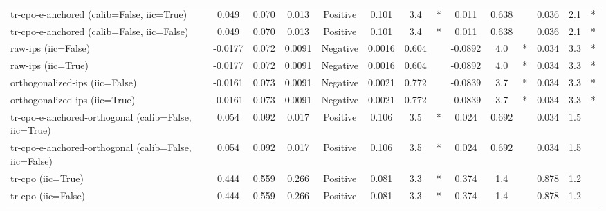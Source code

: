 \begin{table}[htbp]
\begin{tabular}{l|ccccccccccccc}
tr-cpo-e-anchored (calib=False, iic=True) & 0.049 & 0.070 & 0.013 & Positive & 0.101 & 3.4 & * & 0.011 & 0.638 &  & 0.036 & 2.1 & * \\
tr-cpo-e-anchored (calib=False, iic=False) & 0.049 & 0.070 & 0.013 & Positive & 0.101 & 3.4 & * & 0.011 & 0.638 &  & 0.036 & 2.1 & * \\
raw-ips (iic=False) & -0.0177 & 0.072 & 0.0091 & Negative & 0.0016 & 0.604 &  & -0.0892 & 4.0 & * & 0.034 & 3.3 & * \\
raw-ips (iic=True) & -0.0177 & 0.072 & 0.0091 & Negative & 0.0016 & 0.604 &  & -0.0892 & 4.0 & * & 0.034 & 3.3 & * \\
orthogonalized-ips (iic=False) & -0.0161 & 0.073 & 0.0091 & Negative & 0.0021 & 0.772 &  & -0.0839 & 3.7 & * & 0.034 & 3.3 & * \\
orthogonalized-ips (iic=True) & -0.0161 & 0.073 & 0.0091 & Negative & 0.0021 & 0.772 &  & -0.0839 & 3.7 & * & 0.034 & 3.3 & * \\
tr-cpo-e-anchored-orthogonal (calib=False, iic=True) & 0.054 & 0.092 & 0.017 & Positive & 0.106 & 3.5 & * & 0.024 & 0.692 &  & 0.034 & 1.5 &  \\
tr-cpo-e-anchored-orthogonal (calib=False, iic=False) & 0.054 & 0.092 & 0.017 & Positive & 0.106 & 3.5 & * & 0.024 & 0.692 &  & 0.034 & 1.5 &  \\
tr-cpo (iic=True) & 0.444 & 0.559 & 0.266 & Positive & 0.081 & 3.3 & * & 0.374 & 1.4 &  & 0.878 & 1.2 &  \\
tr-cpo (iic=False) & 0.444 & 0.559 & 0.266 & Positive & 0.081 & 3.3 & * & 0.374 & 1.4 &  & 0.878 & 1.2 &  \\
\bottomrule
\end{tabular}
\end{table}